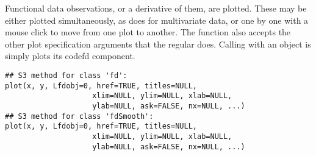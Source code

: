 \documentclass{article}
\begin{document}
\begin{Description}\relax
Functional data observations, or a derivative of them, are plotted.
These may be either plotted simultaneously, as  does for
multivariate data, or one by one with a mouse click to move from one
plot to another.  The function also accepts the other plot
specification arguments that the regular  does.  Calling
 with an  object is simply plots its
code{fd} component.
\end{Description}
\begin{Usage}
\begin{verbatim}
## S3 method for class 'fd':
plot(x, y, Lfdobj=0, href=TRUE, titles=NULL,
                    xlim=NULL, ylim=NULL, xlab=NULL,
                    ylab=NULL, ask=FALSE, nx=NULL, ...)
## S3 method for class 'fdSmooth':
plot(x, y, Lfdobj=0, href=TRUE, titles=NULL,
                    xlim=NULL, ylim=NULL, xlab=NULL,
                    ylab=NULL, ask=FALSE, nx=NULL, ...)
\end{verbatim}
\end{Usage}
\end{document}
